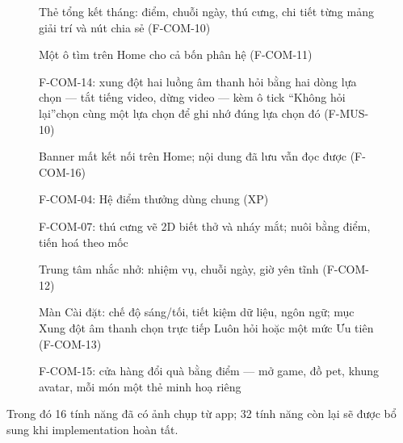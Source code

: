 \begin{figure}[H]
\centering
{}
\caption{\small Thẻ tổng kết tháng: điểm, chuỗi ngày, thú cưng, chi tiết từng mảng giải trí và nút chia sẻ (F-COM-10)}
\end{figure}
\begin{figure}[H]
\centering
{}
\caption{\small Một ô tìm trên Home cho cả bốn phân hệ (F-COM-11)}
\end{figure}
\begin{figure}[H]
\centering
{}
\caption{\small F-COM-14: xung đột hai luồng âm thanh hỏi bằng hai dòng lựa chọn --- tắt tiếng video, dừng video --- kèm ô tick ``Không hỏi lại''chọn cùng một lựa chọn để ghi nhớ đúng lựa chọn đó (F-MUS-10)}
\end{figure}
\begin{figure}[H]
\centering
{}
\caption{\small Banner mất kết nối trên Home; nội dung đã lưu vẫn đọc được (F-COM-16)}
\end{figure}
\begin{figure}[H]
\centering
{}
\caption{\small F-COM-04: Hệ điểm thưởng dùng chung (XP)}
\end{figure}
\begin{figure}[H]
\centering
{}
\caption{\small F-COM-07: thú cưng vẽ 2D biết thở và nháy mắt; nuôi bằng điểm, tiến hoá theo mốc}
\end{figure}
\begin{figure}[H]
\centering
{}
\caption{\small Trung tâm nhắc nhở: nhiệm vụ, chuỗi ngày, giờ yên tĩnh (F-COM-12)}
\end{figure}
\begin{figure}[H]
\centering
{}
\caption{\small Màn Cài đặt: chế độ sáng/tối, tiết kiệm dữ liệu, ngôn ngữ; mục Xung đột âm thanh chọn trực tiếp Luôn hỏi hoặc một mức Ưu tiên (F-COM-13)}
\end{figure}
\begin{figure}[H]
\centering
{}
\caption{\small F-COM-15: cửa hàng đổi quà bằng điểm --- mở game, đồ pet, khung avatar, mỗi món một thẻ minh hoạ riêng}
\end{figure}
\noindent Trong đó 16 tính năng đã có ảnh chụp từ app; 32 tính năng còn lại sẽ được bổ sung khi implementation hoàn tất.
